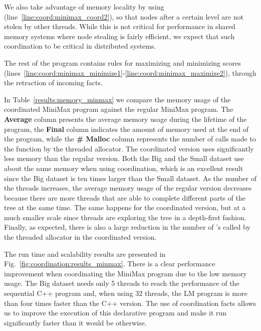 We also take advantage of memory locality by using 
(line~\ref{line:coord:minimax_coord2}), so that nodes after a certain level are
   not stolen by other threads. While this is not critical for performance in
   shared memory systems where node stealing is fairly efficient, we expect that
   such coordination to be critical in distributed systems.

The rest of the program contains rules for maximizing and minimizing scores
(lines~\ref{line:coord:minimax_minimize1}-\ref{line:coord:minimax_maximize2}),
through the retraction of  incoming facts.

\begin{table}[ht]
   \begin{center}
      
   \end{center}

   \label{results:memory_minmax}
\end{table}

In Table~\ref{results:memory_minmax} we compare the memory usage of the
coordinated MiniMax program against the regular MiniMax program. The
\textbf{Average} column presents the average memory usage during the lifetime of
the program, the \textbf{Final} column indicates the amount of memory used at
the end of the program, while the \textbf{\# Malloc} column represents the
number of calls made to the  function by the threaded allocator.
The coordinated version uses significantly less memory than the regular version.
Both the Big and the Small dataset use about the same memory when using
coordination, which is an excellent result since the Big dataset is ten times
larger than the Small dataset.  As the number of the threads increases, the
average memory usage of the regular version decreases because there are more
threads that are able to complete different parts of the tree at the same time.
The same happens for the coordinated version, but at a much smaller scale since
threads are exploring the tree in a depth-first fashion. Finally, as expected,
there is also a large reduction in the number of 's called by the
threaded allocator in the coordinated version.

The run time and scalability results are presented in
Fig.~\ref{fig:coordination:results_minmax}. There is a clear performance
improvement when coordinating the MiniMax program due to the low memory usage.
The Big dataset needs only 5 threads to reach the performance of the
sequential C++ program and, when using 32 threads, the LM program is more than
four times faster than the C++ version. The use of coordination facts allows us
to improve the execution of this declarative program and make it run
significantly faster than it would be otherwise.

